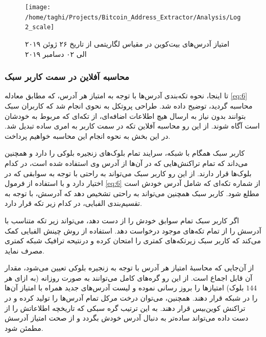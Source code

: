 \begin{figure}[t]
	\centering
	\texttt{[image: /home/taghi/Projects/Bitcoin\_Address\_Extractor/Analysis/Log2\_scale]}
	\caption[امتیاز آدرس‌های بیت‌کوین در مقیاس لگاریتمی]{امتیاز آدرس‌های بیت‌کوین در مقیاس لگاریتمی از تاریخ ۲۶ ژوئن ۲۰۱۹ الی ۰۲ دسامبر ۲۰۱۹}
	\label{fig:log2scale}
\end{figure}


\subsubsection{محاسبه آفلاین در سمت کاربر سبک}
\label{subsubsection:4.3.3}
تا اینجا، نحوه تکه‌بندی آدرس‌ها با توجه به امتیاز هر آدرس، که مطابق معادله \eqref{eq:6} محاسبه گردید، توضیح داده شد. طراحی پروتکل به نحوی انجام شد که کاربران سبک بتوانند بدون نیاز به ارسال هیچ اطلاعات اضافه‌ای، از تکه‌ای که مربوط به خودشان است آگاه شوند. از این رو محاسبه آفلاین تکه در سمت کاربر به امری ساده تبدیل شد. در این بخش به نحوه انجام این محاسبه خواهیم پرداخت.

کاربر سبک همگام با شبکه، سرایند تمام بلوک‌های زنجیره بلوکی را دارد و همچنین می‌داند که تمام تراکنش‌هایی که در آن‌ها از آدرس وی استفاده شده است، در کدام بلوک‌ها قرار دارند. از این رو کاربر سبک می‌تواند به راحتی با توجه به سوابقی که در اختیار دارد و با استفاده از فرمول \eqref{eq:6} از شماره تکه‌ای که شامل آدرس خودش است مطلع شود. کاربر سبک همچنین می‌تواند به راحتی تشخیص دهد که آدرسش، با توجه به تقسیم‌بندی الفبایی، در کدام زیر تکه قرار دارد. 

اگر کاربر سبک تمام سوابق خودش را از دست دهد، می‌تواند زیر تکه متناسب با آدرسش را از تمام تکه‌های موجود درخواست دهد. استفاده از روش چینش الفبایی کمک می‌کند که کاربر سبک  زیرتکه‌های کمتری را امتحان کرده و درنتیحه ترافیک شبکه کمتری مصرف نماید.

از آن‌جایی که محاسبهٔ امتیاز هر آدرس با توجه به زنجیره بلوکی تعیین می‌شود، مقدار آن قابل اجماع است. از این رو گره‌های کامل می‌توانند به صورت روزانه (به ازای هر $144$ بلوک) امتیازها را بروز رسانی نموده و لیست آدرس‌های جدید همراه با امتیاز آن‌ها را در شبکه قرار دهند. همچنین، می‌توان درخت مرکل تمام آدرس‌ها را تولید کرده و در تراکنش کوین‌بیس قرار دهند. به این ترتیب گره سبکی که تاریخچه اطلاعاتش را از دست داده می‌تواند ساده‌تر به دنبال آدرس خودش بگردد و از صحت امتیاز آدرسش مطمئن شود.


%	
%	
%	
%	

